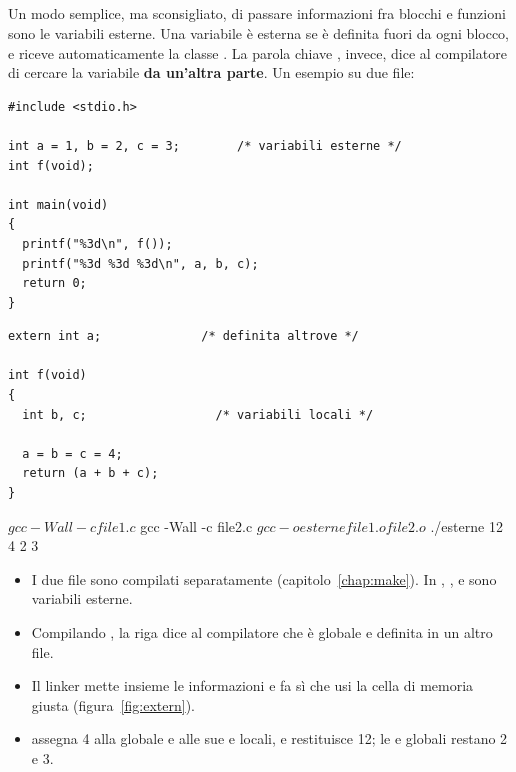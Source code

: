\subsection{}

Un modo semplice, ma sconsigliato, di passare informazioni fra blocchi e
funzioni sono le variabili esterne. Una variabile è esterna se è definita
fuori da ogni blocco, e riceve automaticamente la classe . La
parola chiave , invece, dice al compilatore di cercare la
variabile \textbf{da un'altra parte}. Un esempio su due file:

\begin{affianco}[0.5][t]
\begin{lstlisting}[style=c, name=file1.c]
#include <stdio.h>

int a = 1, b = 2, c = 3;        /* variabili esterne */
int f(void);

int main(void)
{
  printf("%3d\n", f());
  printf("%3d %3d %3d\n", a, b, c);
  return 0;
}
\end{lstlisting}
\risultato
\begin{lstlisting}[style=c, name=file2.c]
extern int a;              /* definita altrove */

int f(void)
{
  int b, c;                  /* variabili locali */

  a = b = c = 4;
  return (a + b + c);
}
\end{lstlisting}
\begin{console}
$ gcc -Wall -c file1.c
$ gcc -Wall -c file2.c
$ gcc -o esterne file1.o file2.o
$ ./esterne
 12
  4   2   3
\end{console}
\end{affianco}

\begin{itemize}
  \item I due file sono compilati separatamente
        (capitolo~\ref{chap:make}). In , ,  e
         sono variabili esterne.
  \item Compilando , la riga  dice al
        compilatore che  è globale e definita in un altro file.
  \item Il linker mette insieme le informazioni e fa sì che  usi la
        cella di memoria giusta (figura~\ref{fig:extern}).
  \item {} assegna 4 alla  globale e alle sue  e
         locali, e restituisce 12; le  e  globali
        restano 2 e 3.
\end{itemize}

